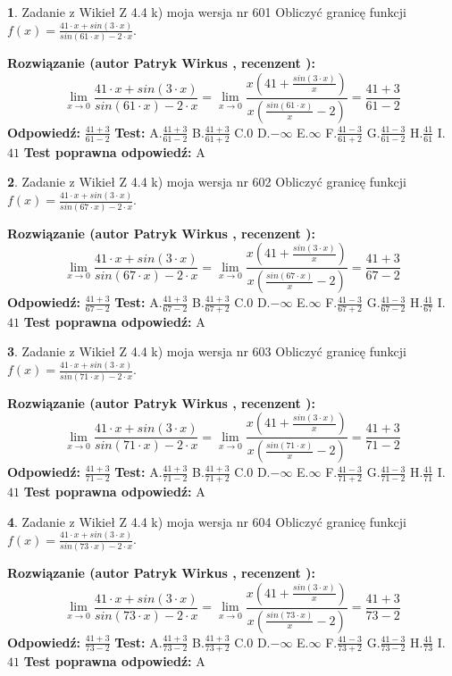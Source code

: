 \documentclass[12pt, a4paper]{article}
\theoremstyle{definition} %
\newtheorem{zad}{}
\newcommand{\zadStart}[1]{\begin{zad}#1\newline}
\newcommand{\zadStop}{\end{zad}}
\newcommand{\rozwStart}[2]{\noindent \textbf{Rozwiązanie (autor #1 , recenzent #2): }\newline}
\newcommand{\rozwStop}{\newline}
\newcommand{\odpStart}{\noindent \textbf{Odpowiedź:}\newline}
\newcommand{\odpStop}{\newline}
\newcommand{\testStart}{\noindent \textbf{Test:}\newline}
\newcommand{\testStop}{\newline}
\newcommand{\kluczStart}{\noindent \textbf{Test poprawna odpowiedź:}\newline}
\newcommand{\kluczStop}{\newline}
\begin{document}
\zadStart{Zadanie z Wikieł Z 4.4 k) moja wersja nr 601}
Obliczyć granicę funkcji $f(x)=\frac{41\cdot x +sin(3\cdot x)}{sin(61\cdot x) -2\cdot x}$.
\zadStop
\rozwStart{Patryk Wirkus}{}
$$\lim\limits_{x\to 0}\frac{41\cdot x +sin(3\cdot x)}{sin(61\cdot x) -2\cdot x}
=\lim\limits_{x\to 0}\frac{x(41+\frac{sin(3\cdot x)}{x})}{x(\frac{sin(61\cdot x)}{x}-2)}
=\frac{41+3}{61-2}$$
\rozwStop
\odpStart
$\frac{41+3}{61-2}$
\odpStop
\testStart
A.$\frac{41+3}{61-2}$
B.$\frac{41+3}{61+2}$
C.$0$
D.$-\infty$
E.$\infty$
F.$\frac{41-3}{61+2}$
G.$\frac{41-3}{61-2}$
H.$\frac{41}{61}$
I.$41$
\testStop
\kluczStart
A
\kluczStop



\zadStart{Zadanie z Wikieł Z 4.4 k) moja wersja nr 602}
Obliczyć granicę funkcji $f(x)=\frac{41\cdot x +sin(3\cdot x)}{sin(67\cdot x) -2\cdot x}$.
\zadStop
\rozwStart{Patryk Wirkus}{}
$$\lim\limits_{x\to 0}\frac{41\cdot x +sin(3\cdot x)}{sin(67\cdot x) -2\cdot x}
=\lim\limits_{x\to 0}\frac{x(41+\frac{sin(3\cdot x)}{x})}{x(\frac{sin(67\cdot x)}{x}-2)}
=\frac{41+3}{67-2}$$
\rozwStop
\odpStart
$\frac{41+3}{67-2}$
\odpStop
\testStart
A.$\frac{41+3}{67-2}$
B.$\frac{41+3}{67+2}$
C.$0$
D.$-\infty$
E.$\infty$
F.$\frac{41-3}{67+2}$
G.$\frac{41-3}{67-2}$
H.$\frac{41}{67}$
I.$41$
\testStop
\kluczStart
A
\kluczStop



\zadStart{Zadanie z Wikieł Z 4.4 k) moja wersja nr 603}
Obliczyć granicę funkcji $f(x)=\frac{41\cdot x +sin(3\cdot x)}{sin(71\cdot x) -2\cdot x}$.
\zadStop
\rozwStart{Patryk Wirkus}{}
$$\lim\limits_{x\to 0}\frac{41\cdot x +sin(3\cdot x)}{sin(71\cdot x) -2\cdot x}
=\lim\limits_{x\to 0}\frac{x(41+\frac{sin(3\cdot x)}{x})}{x(\frac{sin(71\cdot x)}{x}-2)}
=\frac{41+3}{71-2}$$
\rozwStop
\odpStart
$\frac{41+3}{71-2}$
\odpStop
\testStart
A.$\frac{41+3}{71-2}$
B.$\frac{41+3}{71+2}$
C.$0$
D.$-\infty$
E.$\infty$
F.$\frac{41-3}{71+2}$
G.$\frac{41-3}{71-2}$
H.$\frac{41}{71}$
I.$41$
\testStop
\kluczStart
A
\kluczStop



\zadStart{Zadanie z Wikieł Z 4.4 k) moja wersja nr 604}
Obliczyć granicę funkcji $f(x)=\frac{41\cdot x +sin(3\cdot x)}{sin(73\cdot x) -2\cdot x}$.
\zadStop
\rozwStart{Patryk Wirkus}{}
$$\lim\limits_{x\to 0}\frac{41\cdot x +sin(3\cdot x)}{sin(73\cdot x) -2\cdot x}
=\lim\limits_{x\to 0}\frac{x(41+\frac{sin(3\cdot x)}{x})}{x(\frac{sin(73\cdot x)}{x}-2)}
=\frac{41+3}{73-2}$$
\rozwStop
\odpStart
$\frac{41+3}{73-2}$
\odpStop
\testStart
A.$\frac{41+3}{73-2}$
B.$\frac{41+3}{73+2}$
C.$0$
D.$-\infty$
E.$\infty$
F.$\frac{41-3}{73+2}$
G.$\frac{41-3}{73-2}$
H.$\frac{41}{73}$
I.$41$
\testStop
\kluczStart
A
\kluczStop
\end{document}
